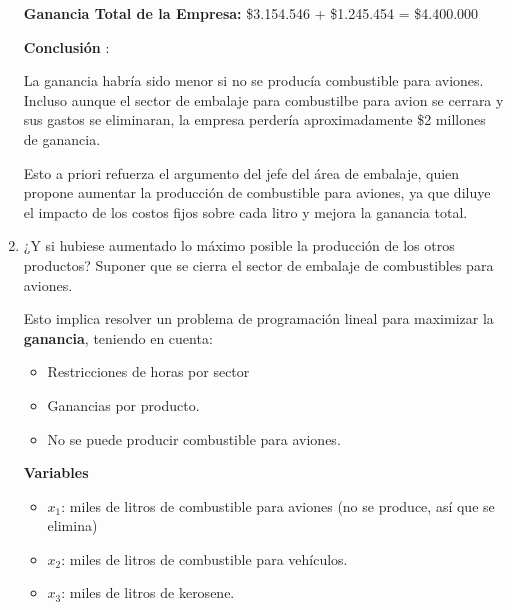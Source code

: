 \documentclass[10pt,a4paper]{article}
\begin{document}
\begin{enumerate}
    \vspace{0.5em}

    \textbf{Ganancia Total de la Empresa: } \$3.154.546 + \$1.245.454  = \$4.400.000

    \vspace{0.5em}

    \textbf{Conclusión }:

    La ganancia habría sido menor si no se producía combustible para aviones. \\
    Incluso aunque el sector de embalaje para combustilbe para avion se cerrara y sus gastos se eliminaran, la empresa perdería aproximadamente \$2 millones de ganancia. 

    Esto a priori refuerza el argumento del jefe del área de embalaje, quien propone aumentar la producción de combustible para aviones, 
    ya que diluye el impacto de los costos fijos sobre cada litro y mejora la ganancia total. \\
    
    \item ¿Y si hubiese aumentado lo máximo posible la producción de los otros productos? Suponer que se cierra el
    sector de embalaje de combustibles para aviones.

    Esto implica resolver un problema de programación lineal para maximizar la \textbf{ganancia}, teniendo en cuenta:

    \begin{itemize}

        \item Restricciones de horas por sector
        \item Ganancias por producto.
        \item No se puede producir combustible para aviones. \\

    \end{itemize}

    \textbf{Variables}

    \begin{itemize}

        \item $x_{1}$: miles de litros de combustible para aviones (no se produce, así que se elimina)
        \item $x_{2}$: miles de litros de combustible para vehículos.
        \item $x_{3}$: miles de litros de kerosene. \\

    \end{itemize}


\end{enumerate}
\end{document}
